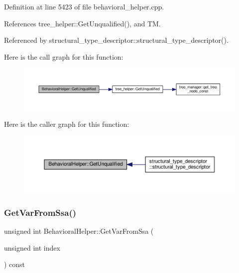 Definition at line 5423 of file behavioral\+\_\+helper.\+cpp.



References tree\+\_\+helper\+::\+Get\+Unqualified(), and TM.



Referenced by structural\+\_\+type\+\_\+descriptor\+::structural\+\_\+type\+\_\+descriptor().

Here is the call graph for this function\+:
\nopagebreak
\begin{figure}[H]
\begin{center}
\leavevmode
\includegraphics[width=350pt]{dd/db2/classBehavioralHelper_abf4e55bf4abfce3b7a49a58803e73f66_cgraph}
\end{center}
\end{figure}
Here is the caller graph for this function\+:
\nopagebreak
\begin{figure}[H]
\begin{center}
\leavevmode
\includegraphics[width=350pt]{dd/db2/classBehavioralHelper_abf4e55bf4abfce3b7a49a58803e73f66_icgraph}
\end{center}
\end{figure}
\mbox{\label{classBehavioralHelper_aee0f46734f9ca668346fbf515f1aa009}} 
\subsubsection{\texorpdfstring{Get\+Var\+From\+Ssa()}{GetVarFromSsa()}}
{\footnotesize\ttfamily unsigned int Behavioral\+Helper\+::\+Get\+Var\+From\+Ssa (\begin{DoxyParamCaption}\item[{unsigned int}]{index }\end{DoxyParamCaption}) const\hspace{0.3cm}{\ttfamily [virtual]}}



